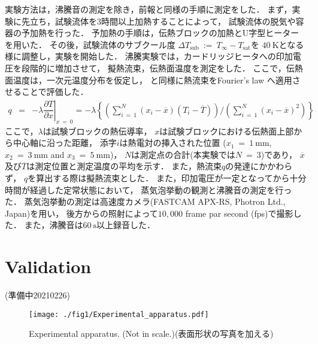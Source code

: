 実験方法は，沸騰音の測定を除き，前報\cite{Horiuchi2021}と同様の手順に測定をした．
まず，実験に先立ち，試験流体を3時間以上加熱することによって，
試験流体の脱気や容器の予加熱を行った．
予加熱の手順は，伝熱ブロックの加熱とU字型ヒーターを用いた．
その後，試験流体のサブクール度
$\Delta{}T_{\mathrm{sub}}~:=~T_{\infty}-T_{\mathrm{sat}}$を
$40~\mathrm{K}$となる様に調整し，実験を開始した．
沸騰実験では，カードリッジヒータへの印加電圧を段階的に増加させて，
擬熱流束，伝熱面温度を測定をした．
ここで，伝熱面温度は，一次元温度分布を仮定し，
\cite{Ando2016}と同様に熱流束をFourier's law へ適用させることで評価した．
\begin{eqnarray}
  q &=& -\lambda{}\left.\dfrac{\partial T}{\partial x}\right|_{x~=~0}
  = -\lambda{}
  \left\{
    \left(
      \sum_{i~=~1}^N (x_i - \overline{x})(T_i - \overline{T})
    \right)
    /
    \left(
      \sum_{i~=~1}^N (x_i - \overline{x})^2
    \right)
  \right\}
\end{eqnarray}
ここで，$\lambda$は試験ブロックの熱伝導率，
$x$は試験ブロックにおける伝熱面上部から中心軸に沿った距離，
添字$i$は熱電対の挿入された位置
($x_1~=~1~\mathrm{mm}$, $x_2~=~3~\mathrm{mm}$ and $x_3~=~5~\mathrm{mm}$)，
$N$は測定点の合計(本実験では$N~=~3$)であり，
$\overline{x}$及び$\overline{T}$は測定位置と測定温度の平均を示す．
また，熱流束$q$の発達にかかわらず，
$q$を算出する際は擬熱流束\cite{Ando2016}とした．
また，印加電圧が一定となってから十分時間が経過した定常状態において，
蒸気泡挙動の観測と沸騰音の測定を行った．
蒸気泡挙動の測定は高速度カメラ(FASTCAM APX-RS, Photron Ltd., Japan)を用い，
後方からの照射によって$10,000$ frame par second (fps)で撮影した．
また，沸騰音は$60~\mathrm{s}$以上録音した．

\section{Validation}
(準備中20210226)

\begin{figure}[bp]
  \centering
  \texttt{[image: ./fig1/Experimental\_apparatus.pdf]}
  \caption{Experimental apparatus. (Not in scale.)(表面形状の写真を加える)}
  \label{apparatus}
\end{figure}

